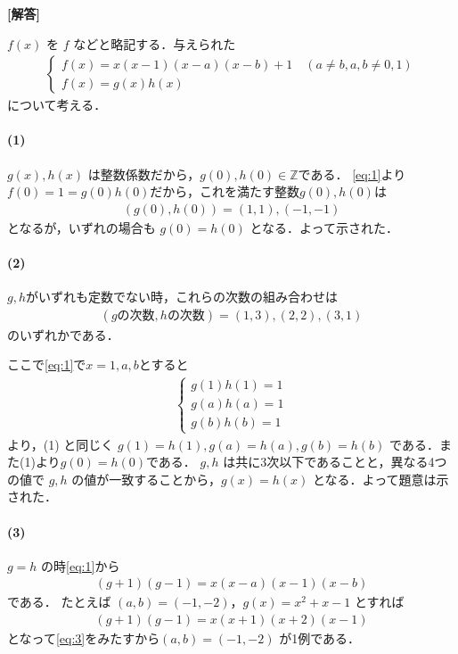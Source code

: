 \documentclass[../../main.tex]{subfiles}
\begin{document}
\begin{oframed}
  
\end{oframed}

{\bf [解答]}

$f(x)$ を $f$ などと略記する．与えられた
\begin{align}
  \begin{cases}
    f(x) = x(x-1)(x-a)(x-b)+1 \quad (a\neq b, a,b \neq 0,1) \\
    f(x) = g(x)h(x)
  \end{cases} \label{eq:1}
\end{align}
について考える．

\paragraph{(1)}

$g(x), h(x)$ は整数係数だから，$g(0), h(0) \in \mathbb{Z}$である．
\cref{eq:1}より$f(0)=1=g(0)h(0)$だから，これを満たす整数$g(0),h(0)$は
\begin{align}
  (g(0), h(0)) = (1, 1), (-1, -1)
\end{align}
となるが，いずれの場合も $g(0) = h(0)$ となる．よって示された．

\paragraph{(2)}

$g,h$がいずれも定数でない時，これらの次数の組み合わせは
\begin{align}
  (g\text{の次数}, h\text{の次数}) = (1, 3), (2, 2), (3,1) \label{eq:2}
\end{align}
のいずれかである．

ここで\cref{eq:1}で$x=1,a,b$とすると
\begin{align}
  \begin{cases}
    g(1)h(1) = 1 \\
    g(a)h(a) = 1 \\
    g(b)h(b) = 1
  \end{cases}
\end{align}
より，(1) と同じく $g(1)=h(1), g(a)=h(a), g(b)=h(b)$ である．また(1)より$g(0)=h(0)$である．
$g, h$ は共に3次以下であることと，異なる4つの値で $g, h$ の値が一致することから，$g(x) = h(x)$ となる．よって題意は示された．

\paragraph{(3)}

$g=h$ の時\cref{eq:1}から
\begin{align}
  (g+1)(g-1) = x(x-a)(x-1)(x-b)  \label{eq:3}
\end{align}
である．
たとえば $(a, b) = (-1, -2)$，$g(x) = x^2+x-1$ とすれば
\begin{align}
  (g+1)(g-1) = x(x+1)(x+2)(x-1)
\end{align}
となって\cref{eq:3}をみたすから$(a, b) = (-1, -2)$ が1例である．
\end{document}
